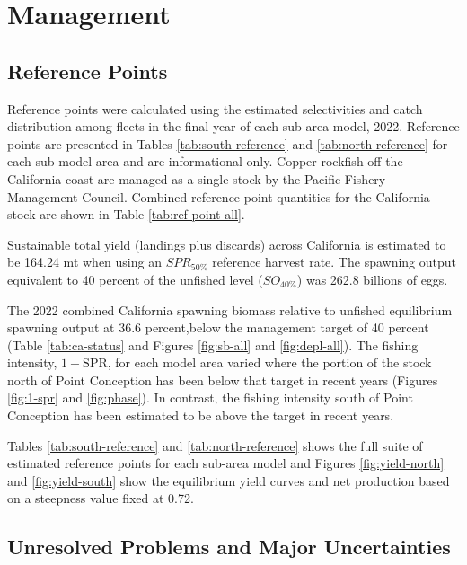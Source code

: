 \documentclass[11pt,
  letterpaper,
]{article}
\begin{document}
\section{Management}\label{management}

\subsection{Reference Points}\label{reference-points}

Reference points were calculated using the estimated selectivities and catch distribution among fleets in the final year of each sub-area model, 2022. Reference points are presented in Tables \ref{tab:south-reference} and \ref{tab:north-reference} for each sub-model area and are informational only. Copper rockfish off the California coast are managed as a single stock by the Pacific Fishery Management Council. Combined reference point quantities for the California stock are shown in Table \ref{tab:ref-point-all}.

Sustainable total yield (landings plus discards) across California is estimated to be 164.24 mt when using an \(SPR_{50\%}\) reference harvest rate. The spawning output equivalent to 40 percent of the unfished level (\(SO_{40\%}\)) was 262.8 billions of eggs.

The 2022 combined California spawning biomass relative to unfished equilibrium spawning output at 36.6 percent,below the management target of 40 percent (Table \ref{tab:ca-status} and Figures \ref{fig:sb-all} and \ref{fig:depl-all}). The fishing intensity, \(1-\text{SPR}\), for each model area varied where the portion of the stock north of Point Conception has been below that target in recent years (Figures \ref{fig:1-spr} and \ref{fig:phase}). In contrast, the fishing intensity south of Point Conception has been estimated to be above the target in recent years.

Tables \ref{tab:south-reference} and \ref{tab:north-reference} shows the full suite of estimated reference points for each sub-area model and Figures \ref{fig:yield-north} and \ref{fig:yield-south} show the equilibrium yield curves and net production based on a steepness value fixed at 0.72.

\subsection{Unresolved Problems and Major Uncertainties}\label{unresolved-problems-and-major-uncertainties}
\end{document}

